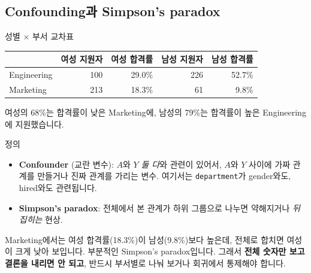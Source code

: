 \documentclass[11pt,a4paper]{article}
\newcommand{\term}[1]{\textbf{#1}}
\newcommand{\code}[1]{\texttt{#1}}
\begin{document}
\subsection{Confounding과 Simpson's paradox}
\begin{databox}{성별 × 부서 교차표}
\begin{center}
\begin{tabular}{@{}l r r r r@{}}
\toprule
 & 여성 지원자 & 여성 합격률 & 남성 지원자 & 남성 합격률 \\
\midrule
Engineering & 100 & 29.0\% & 226 & 52.7\% \\
Marketing & 213 & 18.3\% & 61 & 9.8\% \\
\bottomrule
\end{tabular}
\end{center}
여성의 68\%는 합격률이 낮은 Marketing에, 남성의 79\%는 합격률이 높은 Engineering에 지원했습니다.
\end{databox}

\begin{defbox}{정의}
\begin{itemize}
\item \term{Confounder} (교란 변수): $A$와 $Y$ \emph{둘 다}와 관련이 있어서, $A$와 $Y$ 사이에 가짜 관계를 만들거나 진짜 관계를 가리는 변수. 여기서는 \code{department}가 gender와도, hired와도 관련됩니다.
\item \term{Simpson's paradox}: 전체에서 본 관계가 하위 그룹으로 나누면 약해지거나 \emph{뒤집히는} 현상.
\end{itemize}
\end{defbox}

Marketing에서는 여성 합격률(18.3\%)이 남성(9.8\%)보다 높은데, 전체로 합치면 여성이 크게 낮아 보입니다. 부분적인 Simpson's paradox입니다. 그래서 \textbf{전체 숫자만 보고 결론을 내리면 안 되고}, 반드시 부서별로 나눠 보거나 회귀에서 통제해야 합니다.
\end{document}
